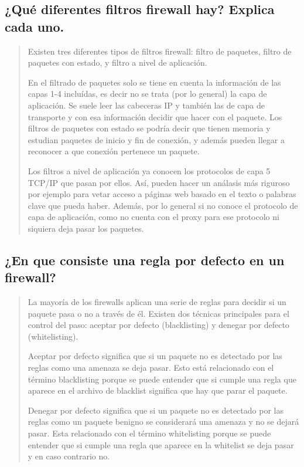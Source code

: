 \documentclass[11pt]{article}
\begin{document}
\subsection{¿Qué diferentes filtros firewall hay? Explica cada uno.}
\label{sec:orgfc7f711}
\begin{quote}
Existen tres diferentes tipos de filtros firewall: filtro de paquetes, filtro de paquetes con estado, y filtro a nivel de aplicación.

En el filtrado de paquetes solo se tiene en cuenta la información de las capas 1-4 incluídas, es decir no se trata (por lo general) la capa de aplicación. Se suele leer las cabeceras IP y también las de capa de transporte y con esa información decidir que hacer con el paquete.
Los filtros de paquetes con estado se podría decir que tienen \guillemotleft{}memoria\guillemotright{} y estudian paquetes de inicio y fin de conexión, y además pueden llegar a reconocer a que conexión pertenece un paquete.

Los filtros a nivel de aplicación ya conocen los protocolos de capa 5 TCP/IP que pasan por ellos. Así, pueden hacer un análasis más riguroso por ejemplo para vetar acceso a páginas web basado en el texto o palabras clave que pueda haber. Además, por lo general si no conoce el protocolo de capa de aplicación, como no cuenta con el \guillemotleft{}proxy\guillemotright{} para ese protocolo ni siquiera deja pasar los paquetes.
\end{quote}
\subsection{¿En que consiste una regla por defecto en un firewall?}
\label{sec:orgce6c774}
\begin{quote}
La mayoría de los firewalls aplican una serie de reglas para decidir si un paquete pasa o no a través de él. Existen dos técnicas principales para el control del paso: aceptar por defecto (blacklisting) y denegar por defecto (whitelisting).

Aceptar por defecto significa que si un paquete no es detectado por las reglas como una \guillemotleft{}amenaza\guillemotright{} se deja pasar. Esto está relacionado con el término blacklisting porque se puede entender que si cumple una regla que aparece en el archivo de \guillemotleft{}blacklist\guillemotright{} significa que hay que parar el paquete.

Denegar por defecto significa que si un paquete no es detectado por las reglas como un paquete \guillemotleft{}benigno\guillemotright{} se considerará una amenaza y no se dejará pasar. Esta relacionado con el término whitelisting porque se puede entender que si cumple una regla que aparece en la \guillemotleft{}whitelist\guillemotright{} se deja pasar y en caso contrario no.
\end{quote}
\end{document}
